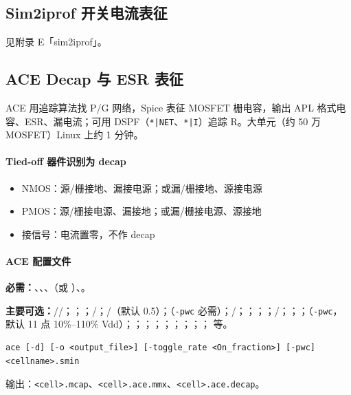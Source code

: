 \subsection{Sim2iprof 开关电流表征}
见附录 E「sim2iprof」。

\subsection{ACE Decap 与 ESR 表征}
ACE 用追踪算法找 P/G 网络，Spice 表征 MOSFET 栅电容，输出 APL 格式电容、ESR、漏电流；可用 DSPF（\texttt{*|NET}、\texttt{*|I}）追踪 R。大单元（约 50 万 MOSFET）Linux 上约 1 分钟。

\paragraph{Tied-off 器件识别为 decap}
\begin{itemize}
  \item NMOS：源/栅接地、漏接电源；或漏/栅接地、源接电源
  \item PMOS：源/栅接电源、漏接地；或漏/栅接电源、源接地
  \item 接信号：电流置零，不作 decap
\end{itemize}

\paragraph{ACE 配置文件}
\textbf{必需：}、、、（或 ）、。

\textbf{主要可选：}//；；；/；/（默认 0.5）；（\texttt{-pwc} 必需）；/；；；；/；；；（\texttt{-pwc}，默认 11 点 10\%--110\% Vdd）；；；；；；；；； 等。

\begin{lstlisting}
ace [-d] [-o <output_file>] [-toggle_rate <On_fraction>] [-pwc] <cellname>.smin
\end{lstlisting}
输出：\texttt{<cell>.mcap}、\texttt{<cell>.ace.mmx}、\texttt{<cell>.ace.decap}。

